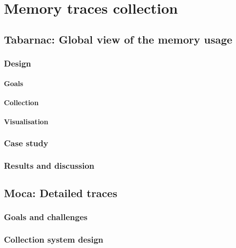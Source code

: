 \chapter{Memory traces collection}

\section{Tabarnac: Global view of the memory usage}


\subsection{Design}

\subsubsection{Goals}

\subsubsection{Collection}

\subsubsection{Visualisation}

\subsection{Case study}

\subsection{Results and discussion}


\section{Moca: Detailed traces}

\subsection{Goals and challenges}

\subsection{Collection system design}


